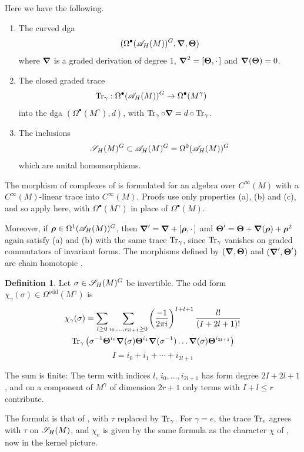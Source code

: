 \documentclass[11pt]{amsart}
\theoremstyle{plain}
\theoremstyle{definition}
\newtheorem{definition}[theorem]{Definition}
\theoremstyle{remark}
\begin{document}
Here we have the following.
\begin{enumerate}
\item[(a)] The curved dga
\[(\Omega^\bullet({\mathscr{A}}_H(M))^G,\boldsymbol{\nabla},\boldsymbol{\Theta})\]
where  $\boldsymbol{\nabla}$ is a graded derivation of degree $1$, $\boldsymbol{\nabla}^2=[\boldsymbol{\Theta},\cdot\,]$ and $\boldsymbol{\nabla}(\boldsymbol{\Theta})=0$.
\item[(b)] The closed graded trace
\[\operatorname{Tr}_\gamma:\Omega^\bullet({\mathscr{A}}_H(M))^G\to\Omega^\bullet(M^\gamma)\qquad \]
into the dga $(\Omega^\bullet(M^\gamma),d)$, with $\operatorname{Tr}_\gamma\circ\boldsymbol{\nabla}=d\circ\operatorname{Tr}_\gamma$.
\item[(c)] The inclusions
\[ {\mathscr{S}_H}(M)^G\subset{\mathscr{A}}_H(M)^G=\Omega^0({\mathscr{A}}_H(M))^G\]
which are  unital homomorphisms.
\end{enumerate}
The morphism of complexes of \cite[Theorem~6.1]{GvE20}  is formulated for an algebra over $C^\infty(M)$ with a $C^\infty(M)$-linear trace into $C^\infty(M)$.
Proofs use only properties (a), (b) and (c), and so apply here, with $\Omega^\bullet(M^\gamma)$ in place of $\Omega^\bullet(M)$.

Moreover, if $\boldsymbol\rho\in\Omega^1({\mathscr{A}}_H(M))^G$, then $\boldsymbol{\nabla}'=\boldsymbol{\nabla}+[\boldsymbol\rho,\cdot\,]$ and $\boldsymbol{\Theta}'=\boldsymbol{\Theta}+\boldsymbol{\nabla}(\boldsymbol\rho)+\boldsymbol\rho^2$ again satisfy (a) and (b) with the same trace $\operatorname{Tr}_\gamma$, since $\operatorname{Tr}_\gamma$ vanishes on graded commutators of invariant forms.
The morphisms defined by $(\boldsymbol{\nabla},\boldsymbol{\Theta})$ and $(\boldsymbol{\nabla}',\boldsymbol{\Theta}')$ are chain homotopic \cite[Proposition~6.3]{GvE20}.

\begin{definition}\label{def:chi_gamma}
Let $\sigma\in{\mathscr{S}_H}(M)^G$ be invertible.
The odd form $\chi_\gamma(\sigma)\in\Omega^{\mathrm{odd}}(M^\gamma)$ is
\begin{multline*}
\chi_\gamma(\sigma) = \sum \limits_{l\ge0} \sum \limits_{i_0, \ldots, i_{2l+1} \ge 0} \left(\frac{-1}{2 \pi i}\right)^{I+l+1} \frac{l!}{(I+2l+1)!}\\
 \operatorname{Tr}_\gamma \left(  \sigma^{-1} \boldsymbol{\Theta}^{i_0} \boldsymbol{\nabla}(\sigma)\boldsymbol{\Theta}^{i_1}\boldsymbol{\nabla}(\sigma^{-1}) \dots \boldsymbol{\nabla}(\sigma) \boldsymbol{\Theta}^{i_{2l+1}}\right)
\end{multline*}
\[I=i_0+i_1+\cdots+i_{2l+1}\]
\end{definition}
The sum is finite: The term with indices $l$, $i_0,\dots,i_{2l+1}$ has form degree $2I+2l+1$,
and on a component of $M^\gamma$ of dimension $2r+1$ only terms with $I+l\le r$ contribute.

The formula is that  of \cite[Theorem~6.7]{GvE20}, with $\tau$ replaced by $\operatorname{Tr}_\gamma$.
For $\gamma=e$, the trace $\operatorname{Tr}_e$ agrees with $\tau$ on ${\mathscr{S}_H}(M)$, and $\chi_e$ is given by the same formula as the character $\chi$ of \cite{GvE20}, now in the kernel picture.
\end{document}
